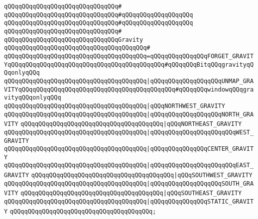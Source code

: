 \verb|qQQqqQQqqQQqqQQqqQQqqQQqqQQqqQQq#|\newline
\verb|qQQqqQQqqQQqqQQqqQQqqQQqqQQqqQQq#qQQqqQQqqQQqqQQqqQQq|\newline
\verb|qQQqqQQqqQQqqQQqqQQqqQQqqQQqqQQq#qQQqqQQqqQQqqQQqqQQq|\newline
\verb|qQQqqQQqqQQqqQQqqQQqqQQqqQQqqQQq#|\newline
\verb|qQQqqQQqqQQqqQQqqQQqqQQqqQQqqQQqGravity|\newline
\verb|qQQqqQQqqQQqqQQqqQQqqQQqqQQqqQQqqQQqqQQq#|\newline
\verb|qQQqqQQqqQQqqQQqqQQqqQQqqQQqqQQqqQQqqQQq=qQQqqQQqqQQqqQQqFORGET_GRAVITYqQQqqQQqqQQqqQQqqQQqqQQqqQQqqQQqqQQqqQQqqQQq#qQQqqQQqBitqQQqgravityqQQqonlyqQQq|\newline
\verb|qQQqqQQqqQQqqQQqqQQqqQQqqQQqqQQqqQQqqQQq|\verb#|qQQqqQQqqQQqqQQqqQQqUNMAP_GRAVITYqQQqqQQqqQQqqQQqqQQqqQQqqQQqqQQqqQQqqQQqqQQq#\verb|#qQQqqQQqwindowqQQqgravityqQQqonlyqQQq|\newline
\verb|qQQqqQQqqQQqqQQqqQQqqQQqqQQqqQQqqQQqqQQq|\verb#|qQQqNORTHWEST_GRAVITY#\newline
\verb|qQQqqQQqqQQqqQQqqQQqqQQqqQQqqQQqqQQqqQQq|\verb#|qQQqqQQqqQQqqQQqqQQqNORTH_GRAVITY#\newline
\verb|qQQqqQQqqQQqqQQqqQQqqQQqqQQqqQQqqQQqqQQq|\verb#|qQQqNORTHEAST_GRAVITY#\newline
\verb|qQQqqQQqqQQqqQQqqQQqqQQqqQQqqQQqqQQqqQQq|\verb#|qQQqqQQqqQQqqQQqqQQqqQQqWEST_GRAVITY#\newline
\verb|qQQqqQQqqQQqqQQqqQQqqQQqqQQqqQQqqQQqqQQq|\verb#|qQQqqQQqqQQqqQQqCENTER_GRAVITY#\newline
\verb|qQQqqQQqqQQqqQQqqQQqqQQqqQQqqQQqqQQqqQQq|\verb#|qQQqqQQqqQQqqQQqqQQqqQQqEAST_GRAVITY#\newline
\verb|qQQqqQQqqQQqqQQqqQQqqQQqqQQqqQQqqQQqqQQq|\verb#|qQQqSOUTHWEST_GRAVITY#\newline
\verb|qQQqqQQqqQQqqQQqqQQqqQQqqQQqqQQqqQQqqQQq|\verb#|qQQqqQQqqQQqqQQqqQQqSOUTH_GRAVITY#\newline
\verb|qQQqqQQqqQQqqQQqqQQqqQQqqQQqqQQqqQQqqQQq|\verb#|qQQqSOUTHEAST_GRAVITY#\newline
\verb|qQQqqQQqqQQqqQQqqQQqqQQqqQQqqQQqqQQqqQQq|\verb#|qQQqqQQqqQQqqQQqSTATIC_GRAVITY#\newline
\verb|qQQqqQQqqQQqqQQqqQQqqQQqqQQqqQQqqQQqqQQq;|\newline
